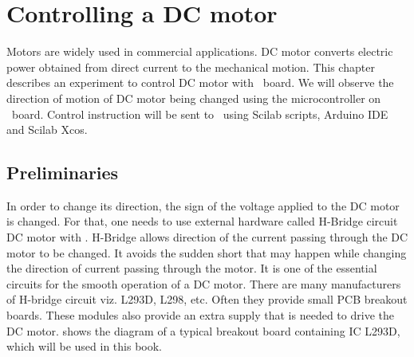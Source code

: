 \chapter{Controlling a DC motor}
\thispagestyle{empty}
\label{dcmotor}
\newcommand{\LocDCMfig}{\Origin/user-code/dcmotor/figures}
\newcommand{\LocDCMscicode}{\Origin/user-code/dcmotor/scilab}
\newcommand{\LocDCMscibrief}[1]{{\tt \seqsplit{
    Origin/user-code/dcmotor/scilab/#1}}, 
see \fnrefp{fn:file-loc}}
\newcommand{\LocDCMardcode}{\Origin/user-code/dcmotor/arduino}
\newcommand{\LocDCMardbrief}[1]{{\tt \seqsplit{
    Origin/user-code/dcmotor/arduino/#1}}, 
see \fnrefp{fn:file-loc}}

\newcommand{\LocDCMpycode}{\Origin/user-code/dcmotor/python}
\newcommand{\LocDCMpybrief}[1]{{\tt \seqsplit{
    Origin/user-code/dcmotor/python/#1}}, 
see \fnrefp{fn:file-loc}}

\newcommand{\LocDCMjuliacode}{\Origin/user-code/dcmotor/julia}
\newcommand{\LocDCMjuliabrief}[1]{{\tt \seqsplit{
    Origin/user-code/dcmotor/julia/#1}}, 
see \fnrefp{fn:file-loc}}

\newcommand{\LocDCMOpenModelicacode}{\Origin/user-code/dcmotor/OpenModelica}  %
\newcommand{\LocDCMOpenModelicabrief}[1]{{\tt \seqsplit{%
    Origin/user-code/led/OpenModelica/#1}}, see \fnrefp{fn:file-loc}} %


Motors are widely used in commercial applications. DC motor converts
electric power obtained from direct current to the mechanical
motion. This chapter describes an experiment to control DC motor with
\arduino\ board. We will observe the direction of motion of DC motor
being changed using the microcontroller on \arduino\ board. Control
instruction will be sent to \arduino\ using Scilab scripts, Arduino IDE and Scilab Xcos.

\section{Preliminaries}
In order to change its direction, the sign of the voltage applied to
the DC motor is changed.  For that, one needs to use external hardware
called %
H-Bridge circuit DC motor with \arduino. %
H-Bridge allows direction of the current passing through the DC motor
to be changed. It avoids the sudden short that may happen while
changing the direction of current passing through the motor.  It is
one of the essential circuits for the smooth operation of a DC
motor. There are many manufacturers of H-bridge circuit viz.
%
L293D, L298, etc.  Often they provide small %
PCB breakout boards.  These modules also provide an extra supply that
is needed to drive the DC motor.   shows
the diagram of a typical breakout board containing IC L293D, which will
be used in this book. \par

